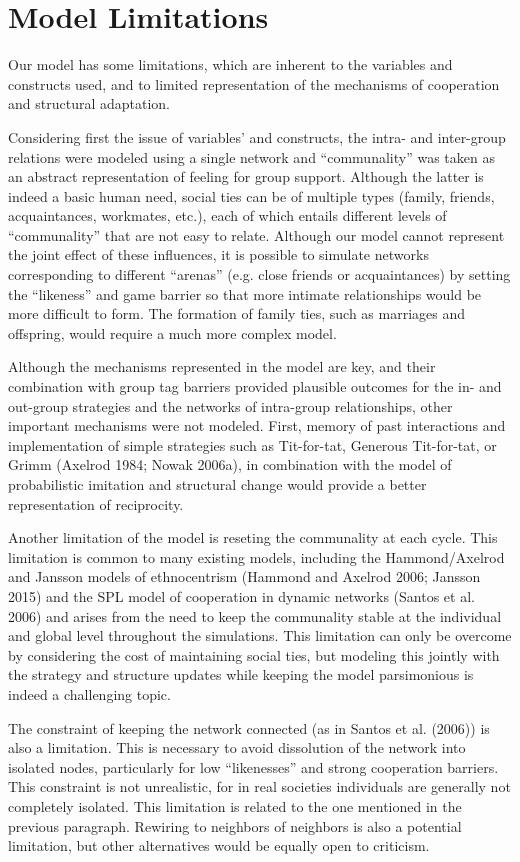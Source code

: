 \section{Model Limitations}
Our model has some limitations, which are inherent to the variables and constructs used, and to limited representation of the mechanisms of cooperation and structural adaptation.

Considering first the issue of variables' and constructs, the intra- and inter-group relations were modeled using a single network and ``communality'' was taken as an abstract representation of feeling for group support. Although the latter is indeed a basic human need, social ties can be of multiple types (family, friends, acquaintances, workmates, etc.), each of which entails different levels of ``communality'' that are not easy to relate. Although our model cannot represent the joint effect of these influences, it is possible to simulate networks corresponding to different ``arenas'' (e.g. close friends or acquaintances) by setting the ``likeness'' and game barrier so that more intimate relationships would be more difficult to form. The formation of family ties, such as marriages and offspring, would require a much more complex model.

Although the mechanisms represented in the model are key, and their combination with group tag barriers provided plausible outcomes for the in- and out-group strategies and the networks of intra-group relationships, other important mechanisms were not modeled. First, memory of past interactions and implementation of simple strategies such as Tit-for-tat, Generous Tit-for-tat, or Grimm (Axelrod 1984; Nowak 2006a), in combination with the model of probabilistic imitation and structural change would provide a better representation of reciprocity. 

Another limitation of the model is reseting the communality at each cycle. This limitation is common to many existing models, including the Hammond/Axelrod and Jansson models of ethnocentrism (Hammond and Axelrod 2006; Jansson 2015) and the SPL model of cooperation in dynamic networks (Santos et al. 2006) and arises from the need to keep the communality stable at the individual and global level throughout the simulations. This limitation can only be overcome by considering the cost of maintaining social ties, but modeling this jointly with the strategy and structure updates while keeping the model parsimonious is indeed a challenging topic.

The constraint of keeping the network connected (as in Santos et al. (2006)) is also a limitation. This is necessary to avoid dissolution of the network into isolated nodes, particularly for low ``likenesses'' and strong cooperation barriers. This constraint is not unrealistic, for in real societies individuals are generally not completely isolated. This limitation is related to the one mentioned in the previous paragraph. Rewiring to neighbors of neighbors is also a potential limitation, but other alternatives would be equally open to criticism.

